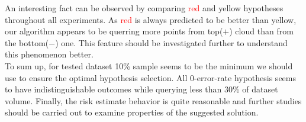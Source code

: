 \documentclass[12pt, a4paper, pdflatex, leqno, twoside]{report}
\begin{document}
An interesting fact can be observed by comparing \textcolor{red}{red} and 
\textcolor{Dandelion}{yellow} hypotheses throughout all experiments. As 
\textcolor{red}{red} is always predicted to be better than 
\textcolor{Dandelion}{yellow}, our algorithm appears to be querring more points 
from top($+$) cloud than from the bottom($-$) one. This feature should be 
investigated further to understand this phenomenon better.\\

To sum up, for tested dataset 10\% sample seems to be the minimum we should use 
to ensure the optimal hypothesis selection. All 0-error-rate hypothesis seems to 
have indistinguishable outcomes while querying less than 30\% of dataset 
volume. Finally, the risk estimate behavior is quite reasonable and further studies should be 
carried out to examine properties of the suggested solution.\\
\end{document}
